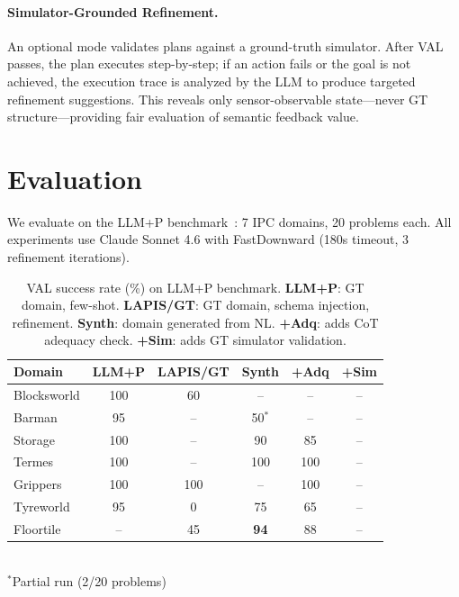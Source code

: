 \documentclass[letterpaper]{article}
\begin{document}
\paragraph{Simulator-Grounded Refinement.}
An optional mode validates plans against a ground-truth simulator. After VAL passes, the plan executes step-by-step; if an action fails or the goal is not achieved, the execution trace is analyzed by the LLM to produce targeted refinement suggestions. This reveals only sensor-observable state---never GT structure---providing fair evaluation of semantic feedback value.

\section{Evaluation}

We evaluate on the LLM+P benchmark~\citep{llmpp2023}: 7 IPC domains, 20 problems each. All experiments use Claude Sonnet 4.6 with FastDownward (180s timeout, 3 refinement iterations).

\begin{table}[t]
\centering
\caption{VAL success rate (\%) on LLM+P benchmark. \textbf{LLM+P}: GT domain, few-shot. \textbf{LAPIS/GT}: GT domain, schema injection, refinement. \textbf{Synth}: domain generated from NL. \textbf{+Adq}: adds CoT adequacy check. \textbf{+Sim}: adds GT simulator validation.}
\label{tab:results}
\setlength{\tabcolsep}{2.5pt}
\small
\begin{tabular}{lccccc}
\toprule
Domain & LLM+P & LAPIS/GT & Synth & +Adq & +Sim \\
\midrule
Blocksworld & 100 & 60 & -- & -- & -- \\
Barman & 95 & -- & 50$^*$ & -- & -- \\
Storage & 100 & -- & 90 & 85 & -- \\
Termes & 100 & -- & 100 & 100 & -- \\
Grippers & 100 & 100 & -- & 100 & -- \\
Tyreworld & 95 & 0 & 75 & 65 & -- \\
Floortile & -- & 45 & \textbf{94} & 88 & -- \\
\bottomrule
\end{tabular}
\\[2pt]
{\footnotesize $^*$Partial run (2/20 problems)}
\end{table}

\end{document}
